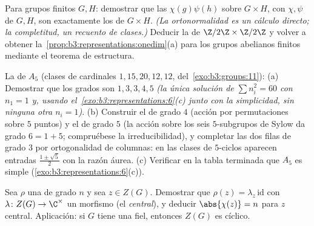 \begin{exercise}[$\star\star\star$]\label{exo:b3:representations:8}
Para grupos finitos $G, H$: demostrar que las
$\chi(g)\psi(h)$ sobre $G \times H$, con $\chi, \psi$
 de $G, H$, son
exactamente los 
 de $G \times H$.
\emph{(La ortonormalidad es un cálculo directo; la completitud, un
recuento de clases.)} Deducir la
 de
$\Z/2\Z \times \Z/2\Z$ y volver a obtener
la~\cref{prop:b3:representations:onedim}(a) para los grupos abelianos
finitos mediante el teorema de estructura.
\end{exercise}

\begin{exercise}[$\star\star\star$]\label{exo:b3:representations:9}
La  de $A_5$
(clases de cardinales $1, 15, 20, 12,
12$, del~\cref{exo:b3:groups:11}): (a) Demostrar que los grados son
$1, 3, 3, 4, 5$ \emph{(la única solución de $\sum n_i^2 = 60$ con
$n_1 = 1$ y, usando el~\cref{exo:b3:representations:6}(c) junto con la
simplicidad, sin ninguna otra
$n_i = 1$)}.
(b) Construir el  de
grado $4$ (acción por permutaciones sobre $5$ puntos) y el
 de grado $5$ (la
acción sobre los seis $5$-subgrupos de Sylow da grado $6 = 1 + 5$;
compruébese la irreducibilidad), y completar las dos filas de grado $3$
por ortogonalidad de columnas: en las clases de $5$-ciclos aparecen
entradas $\frac{1\pm\sqrt5}2$ con la razón áurea. (c) Verificar en la
tabla terminada que $A_5$ es simple
(\cref{exo:b3:representations:6}(c)).
\end{exercise}

\begin{exercise}[$\star\star$]\label{exo:b3:representations:10}
Sea $\rho$ una  de grado $n$ y sea $z
\in Z(G)$. Demostrar que $\rho(z) = \lambda_z\,\mathrm{id}$ con
$\lambda \colon Z(G) \to \C^\times$ un morfismo (el
\emph{ central}), y
deducir $\abs{\chi(z)} = n$ para $z$ central. Aplicación: si $G$ tiene
una 
fiel, entonces $Z(G)$ es cíclico.
\end{exercise}

